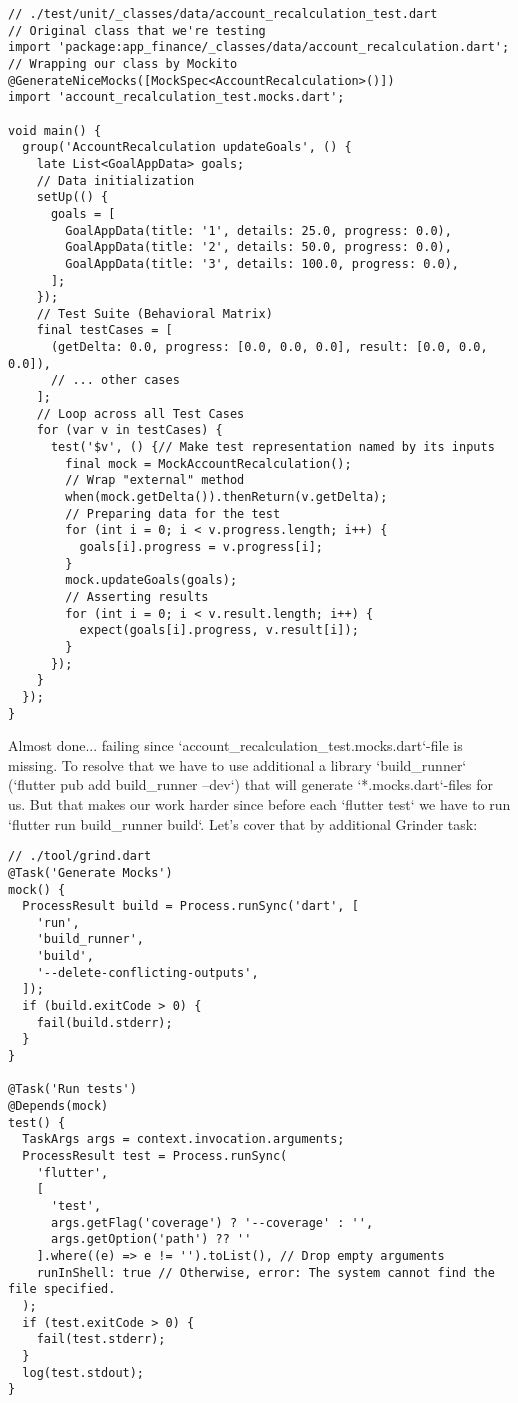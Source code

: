 \begin{lstlisting}
// ./test/unit/_classes/data/account_recalculation_test.dart
// Original class that we're testing
import 'package:app_finance/_classes/data/account_recalculation.dart';
// Wrapping our class by Mockito
@GenerateNiceMocks([MockSpec<AccountRecalculation>()])
import 'account_recalculation_test.mocks.dart';

void main() {
  group('AccountRecalculation updateGoals', () {
    late List<GoalAppData> goals;
    // Data initialization
    setUp(() {
      goals = [
        GoalAppData(title: '1', details: 25.0, progress: 0.0),
        GoalAppData(title: '2', details: 50.0, progress: 0.0),
        GoalAppData(title: '3', details: 100.0, progress: 0.0),
      ];
    });
    // Test Suite (Behavioral Matrix)
    final testCases = [
      (getDelta: 0.0, progress: [0.0, 0.0, 0.0], result: [0.0, 0.0, 0.0]),
      // ... other cases
    ];
    // Loop across all Test Cases
    for (var v in testCases) {
      test('$v', () {// Make test representation named by its inputs
        final mock = MockAccountRecalculation();
        // Wrap "external" method
        when(mock.getDelta()).thenReturn(v.getDelta);
        // Preparing data for the test
        for (int i = 0; i < v.progress.length; i++) {
          goals[i].progress = v.progress[i];
        }
        mock.updateGoals(goals);
        // Asserting results
        for (int i = 0; i < v.result.length; i++) {
          expect(goals[i].progress, v.result[i]);
        }
      });
    }
  });
}
\end{lstlisting}

Almost done... failing since `account\_recalculation\_test.mocks.dart`-file is missing. To resolve that we have to use 
additional a library `build\_runner` (`flutter pub add build\_runner --dev`) that will generate `*.mocks.dart`-files
for us. But that makes our work harder since before each `flutter test` we have to run `flutter run build\_runner build`.
Let's cover that by additional Grinder task:

\begin{lstlisting}
// ./tool/grind.dart
@Task('Generate Mocks')
mock() {
  ProcessResult build = Process.runSync('dart', [
    'run',
    'build_runner',
    'build',
    '--delete-conflicting-outputs',
  ]);
  if (build.exitCode > 0) {
    fail(build.stderr);
  }
}

@Task('Run tests')
@Depends(mock)
test() {
  TaskArgs args = context.invocation.arguments;
  ProcessResult test = Process.runSync(
    'flutter', 
    [
      'test',
      args.getFlag('coverage') ? '--coverage' : '',
      args.getOption('path') ?? ''
    ].where((e) => e != '').toList(), // Drop empty arguments 
    runInShell: true // Otherwise, error: The system cannot find the file specified. 
  );
  if (test.exitCode > 0) {
    fail(test.stderr);
  }
  log(test.stdout);
}
\end{lstlisting}

